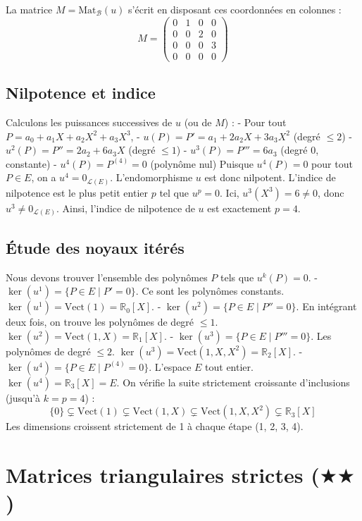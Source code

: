 \documentclass[11pt,a4paper]{article}
\begin{document}
La matrice $M = \text{Mat}_{\mathcal{B}}(u)$ s'écrit en disposant ces coordonnées en colonnes :
$$M = \begin{pmatrix} 0 & 1 & 0 & 0 \\ 0 & 0 & 2 & 0 \\ 0 & 0 & 0 & 3 \\ 0 & 0 & 0 & 0 \end{pmatrix}$$

\subsection{Nilpotence et indice}
Calculons les puissances successives de $u$ (ou de $M$) :
- Pour tout $P = a_0 + a_1 X + a_2 X^2 + a_3 X^3$,
- $u(P) = P' = a_1 + 2a_2 X + 3a_3 X^2$ (degré $\le 2$)
- $u^2(P) = P'' = 2a_2 + 6a_3 X$ (degré $\le 1$)
- $u^3(P) = P''' = 6a_3$ (degré $0$, constante)
- $u^4(P) = P^{(4)} = 0$ (polynôme nul)
Puisque $u^4(P) = 0$ pour tout $P \in E$, on a $u^4 = 0_{\mathcal{L}(E)}$. L'endomorphisme $u$ est donc nilpotent.
L'indice de nilpotence est le plus petit entier $p$ tel que $u^p = 0$.
Ici, $u^3(X^3) = 6 \neq 0$, donc $u^3 \neq 0_{\mathcal{L}(E)}$.
Ainsi, l'indice de nilpotence de $u$ est exactement $p = 4$.

\subsection{Étude des noyaux itérés}
Nous devons trouver l'ensemble des polynômes $P$ tels que $u^k(P) = 0$.
- $\ker(u^1) = \{ P \in E \mid P' = 0 \}$. Ce sont les polynômes constants. $\ker(u^1) = \text{Vect}(1) = \mathbb{R}_0[X]$.
- $\ker(u^2) = \{ P \in E \mid P'' = 0 \}$. En intégrant deux fois, on trouve les polynômes de degré $\le 1$. $\ker(u^2) = \text{Vect}(1, X) = \mathbb{R}_1[X]$.
- $\ker(u^3) = \{ P \in E \mid P''' = 0 \}$. Les polynômes de degré $\le 2$. $\ker(u^3) = \text{Vect}(1, X, X^2) = \mathbb{R}_2[X]$.
- $\ker(u^4) = \{ P \in E \mid P^{(4)} = 0 \}$. L'espace $E$ tout entier. $\ker(u^4) = \mathbb{R}_3[X] = E$.
On vérifie la suite strictement croissante d'inclusions (jusqu'à $k=p=4$) :
$$\{0\} \subsetneq \text{Vect}(1) \subsetneq \text{Vect}(1, X) \subsetneq \text{Vect}(1, X, X^2) \subsetneq \mathbb{R}_3[X]$$
Les dimensions croissent strictement de 1 à chaque étape (1, 2, 3, 4).


\section{Matrices triangulaires strictes ($\bigstar$$\bigstar$)}
\end{document}

